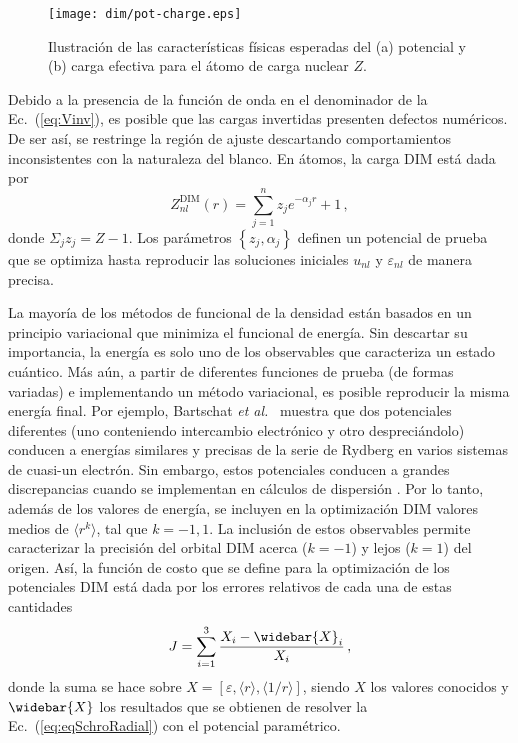 \begin{figure}[t]
\centering
\texttt{[image: dim/pot-charge.eps]}
\caption[Características físicas del potencial y carga efectiva.]
{Ilustración de las características físicas esperadas del (a) potencial 
y (b) carga efectiva para el átomo de carga nuclear $Z$.}
\label{fig:potycharge}
\end{figure}

Debido a la presencia de la función de onda en 
el denominador de la Ec.~(\ref{eq:Vinv}), es posible que las cargas 
invertidas presenten defectos numéricos. De ser así, se restringe la 
región de ajuste descartando comportamientos inconsistentes con la 
naturaleza del blanco. En átomos, la carga DIM está dada por
\begin{equation}
Z_{nl}^{\mathrm{DIM}}(r)= \sum_{j=1}^{n} z_j e^{-\alpha_j r}+1 \,,
\label{eq:atomzDIM}
\end{equation}
donde $\Sigma_j z_j=Z-1$. Los parámetros $\left\{z_j,\alpha_j\right\}$ 
definen un potencial de prueba que se optimiza hasta reproducir las 
soluciones iniciales $u_{nl}$ y $\varepsilon_{nl}$ de manera precisa. 

La mayoría de los métodos de funcional de la densidad están basados en 
un principio variacional que minimiza el funcional de energía. Sin 
descartar su importancia, la energía es solo uno de los observables que 
caracteriza un estado cuántico. Más aún, a partir de diferentes 
funciones de prueba (de formas variadas) e implementando un método 
variacional, es posible reproducir la misma energía final. Por ejemplo, 
Bartschat \textit{et al.}~\cite{Albright:93,Bartschat:96} muestra que 
dos potenciales diferentes (uno conteniendo intercambio electrónico y 
otro despreciándolo) conducen a energías similares y precisas de la 
serie de Rydberg en varios sistemas de cuasi-un electrón. Sin embargo, 
estos potenciales conducen a grandes discrepancias cuando se implementan 
en cálculos de dispersión \cite{BartschatBray:96}. Por lo tanto, además 
de los valores de energía, se incluyen en la optimización DIM valores 
medios de $\langle r^k \rangle$, tal que $k=-1,1$. La inclusión de estos 
observables permite caracterizar la precisión del orbital DIM acerca 
($k=-1$) y lejos ($k=1$) del origen. Así, la función de costo que se 
define para la optimización de los potenciales DIM está dada por los 
errores relativos de cada una de estas cantidades
\begin{equation}
J=\sum_{i=1}^3 \frac{X_i-\widebar{X}_i}{X_i}\,,
\label{eq:fncosto-dim}
\end{equation}
donde la suma se hace sobre 
$X=\left[\varepsilon,\langle r \rangle,\langle 1/r \rangle\right]$, siendo 
$X$ los valores conocidos y $\widebar{X}$ los resultados que se obtienen
de resolver la Ec.~(\ref{eq:eqSchroRadial}) con el potencial paramétrico. 

